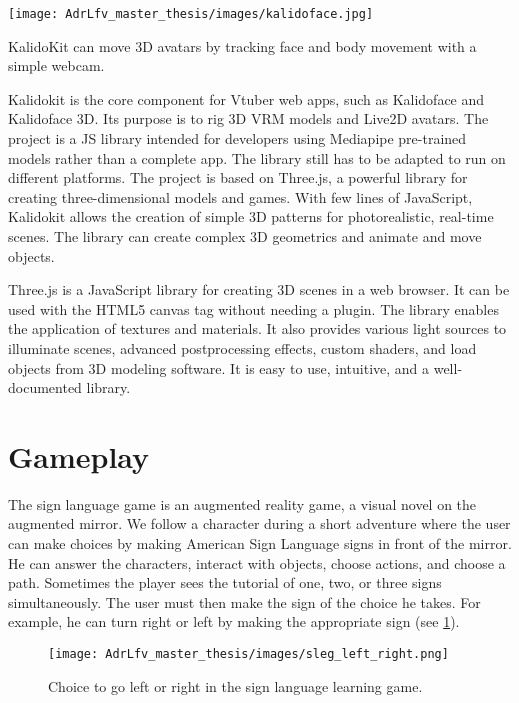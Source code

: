 \begin{marginfigure}
    \centering
    \texttt{[image: AdrLfv\_master\_thesis/images/kalidoface.jpg]}
    \caption{KalidoKit can move 3D avatars by tracking face and body movement with a simple webcam.}
    \label{fig:kalidoface}
\end{marginfigure}

Kalidokit is the core component for Vtuber web apps, such as Kalidoface and Kalidoface 3D. Its purpose is to rig 3D VRM models and Live2D avatars. The project is a JS library intended for developers using Mediapipe pre-trained models rather than a complete app. The library still has to be adapted to run on different platforms. The project is based on Three.js, a powerful library for creating three-dimensional models and games. 
With few lines of JavaScript, Kalidokit allows the creation of simple 3D patterns for photorealistic, real-time scenes. The library can create complex 3D geometrics and animate and move objects.

Three.js is a JavaScript library for creating 3D scenes in a web browser. It can be used with the HTML5 canvas tag without needing a plugin. The library enables the application of textures and materials. It also provides various light sources to illuminate scenes, advanced postprocessing effects, custom shaders, and load objects from 3D modeling software. It is easy to use, intuitive, and a well-documented library.

\section{Gameplay}

The sign language game is an augmented reality game, a visual novel on the augmented mirror. We follow a character during a short adventure where the user can make choices by making American Sign Language signs in front of the mirror. He can answer the characters, interact with objects, choose actions, and choose a path. 
Sometimes the player sees the tutorial of one, two, or three signs simultaneously. The user must then make the sign of the choice he takes. For example, he can turn right or left by making the appropriate sign (see \ref{fig:sleg_left_right}). 

\begin{figure}[h]
    \centering
    \texttt{[image: AdrLfv\_master\_thesis/images/sleg\_left\_right.png]}
    \caption{Choice to go left or right in the sign language learning game.}
    \label{fig:sleg_left_right}
\end{figure}

